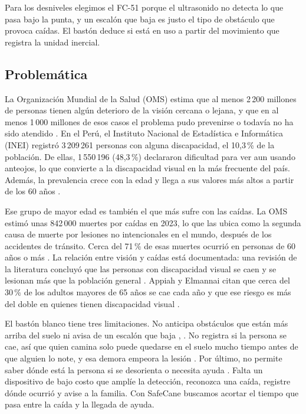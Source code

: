 \documentclass[conference,a4paper]{IEEEtran}
\begin{document}
Para los desniveles elegimos el FC-51 porque el ultrasonido no detecta lo que pasa bajo la punta, y un escalón que baja es justo el tipo de obstáculo que provoca caídas. El bastón deduce si está en uso a partir del movimiento que registra la unidad inercial.

\subsection{Problemática}

La Organización Mundial de la Salud (OMS) estima que al menos 2\,200 millones de personas tienen algún deterioro de la visión cercana o lejana, y que en al menos 1\,000 millones de esos casos el problema pudo prevenirse o todavía no ha sido atendido \cite{oms_vision}. En el Perú, el Instituto Nacional de Estadística e Informática (INEI) registró 3\,209\,261 personas con alguna discapacidad, el 10,3\,\% de la población. De ellas, 1\,550\,196 (48,3\,\%) declararon dificultad para ver aun usando anteojos, lo que convierte a la discapacidad visual en la más frecuente del país. Además, la prevalencia crece con la edad y llega a sus valores más altos a partir de los 60 años \cite{inei}.

Ese grupo de mayor edad es también el que más sufre con las caídas. La OMS estimó unas 842\,000 muertes por caídas en 2023, lo que las ubica como la segunda causa de muerte por lesiones no intencionales en el mundo, después de los accidentes de tránsito. Cerca del 71\,\% de esas muertes ocurrió en personas de 60 años o más \cite{oms_caidas}. La relación entre visión y caídas está documentada: una revisión de la literatura concluyó que las personas con discapacidad visual se caen y se lesionan más que la población general \cite{legood}. Appiah y Elmannai citan que cerca del 30\,\% de los adultos mayores de 65 años se cae cada año y que ese riesgo es más del doble en quienes tienen discapacidad visual \cite{appiah}.

El bastón blanco tiene tres limitaciones. No anticipa obstáculos que están más arriba del suelo ni avisa de un escalón que baja \cite{dakopoulos}, \cite{paredes}. No registra si la persona se cae, así que quien camina solo puede quedarse en el suelo mucho tiempo antes de que alguien lo note, y esa demora empeora la lesión \cite{fitriandini}. Por último, no permite saber dónde está la persona si se desorienta o necesita ayuda \cite{abuelmakarem}. Falta un dispositivo de bajo costo que amplíe la detección, reconozca una caída, registre dónde ocurrió y avise a la familia. Con SafeCane buscamos acortar el tiempo que pasa entre la caída y la llegada de ayuda.
\end{document}
